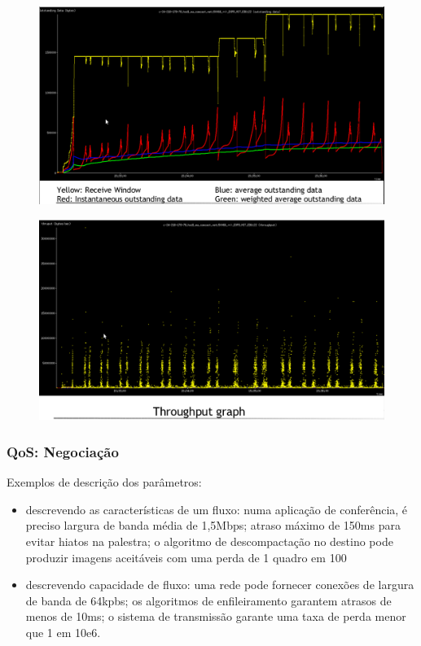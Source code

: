 \documentclass[]{beamer}
\begin{document}
\begin{frame}
   \begin{figure}[hbtp]
  \caption{}
  \begin{center}
   \includegraphics[scale=0.28]{tcp_outstanding_data.png}
  \end{center}
 \end{figure}
\end{frame}

\begin{frame}
   \begin{figure}[hbtp]
  \caption{}
  \begin{center}
   \includegraphics[scale=0.28]{throughput.png}
  \end{center}
 \end{figure}
\end{frame}

\begin{frame}
  \frametitle{QoS: Negociação}
Exemplos de descrição dos parâmetros: 
\begin{itemize}
 \item descrevendo as características de um fluxo: numa aplicação de conferência,
é preciso largura de banda média de 1,5Mbps; atraso máximo
de 150ms para evitar hiatos na palestra; o algoritmo de descompactação
no destino pode produzir imagens aceitáveis com uma perda de 1 quadro em 100
  \item descrevendo capacidade de fluxo: uma rede pode fornecer conexões de largura de banda
de 64kpbs; os algoritmos de enfileiramento garantem atrasos de menos de 10ms; o sistema
de transmissão garante uma taxa de perda menor que 1 em 10e6.
\end{itemize}
\end{frame}
\end{document}
